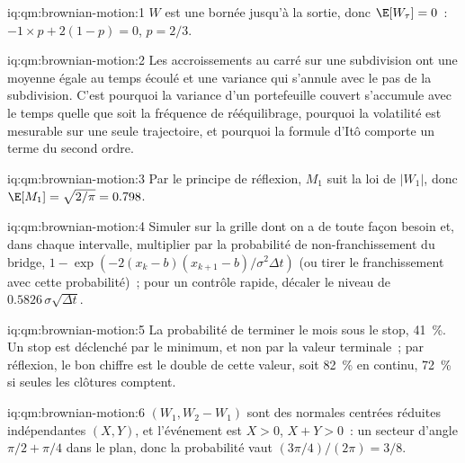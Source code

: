 \begin{solution}{iq:qm:brownian-motion:1}
$W$ est une  bornée jusqu'à la sortie, donc $\E[W_\tau] = 0$~: $-1 \times p + 2(1 - p) = 0$,
$p = 2/3$.
\end{solution}

\begin{solution}{iq:qm:brownian-motion:2}
Les accroissements au carré sur une subdivision ont une moyenne égale au temps écoulé et une variance
qui s'annule avec le pas de la subdivision. C'est pourquoi la variance d'un portefeuille couvert s'accumule avec le temps
quelle que soit la fréquence de rééquilibrage, pourquoi la volatilité est mesurable sur une seule trajectoire, et pourquoi
la formule d'Itô comporte un terme du second ordre.
\end{solution}

\begin{solution}{iq:qm:brownian-motion:3}
Par le principe de réflexion, $M_1$ suit la loi de $|W_1|$, donc $\E[M_1] = \sqrt{2/\pi} = 0.798$.
\end{solution}

\begin{solution}{iq:qm:brownian-motion:4}
Simuler sur la grille dont on a de toute façon besoin et, dans chaque intervalle, multiplier par la probabilité
de non-franchissement du bridge, $1 - \exp(-2(x_k - b)(x_{k+1} - b)/\sigma^2\Delta t)$ (ou tirer le
franchissement avec cette probabilité)~; pour un contrôle rapide, décaler le niveau de $0.5826\,\sigma\sqrt{\Delta t}$.
\end{solution}

\begin{solution}{iq:qm:brownian-motion:5}
La probabilité de terminer le mois sous le stop, 41~\%. Un stop est déclenché par le minimum,
et non par la valeur terminale~; par réflexion, le bon chiffre est le double de cette valeur, soit 82~\% en continu, 72~\%
si seules les clôtures comptent.
\end{solution}

\begin{solution}{iq:qm:brownian-motion:6}
$(W_1, W_2 - W_1)$ sont des normales centrées réduites indépendantes $(X, Y)$, et l'événement est $X > 0$, $X + Y >
0$~: un secteur d'angle $\pi/2 + \pi/4$ dans le plan, donc la probabilité vaut $(3\pi/4)/(2\pi) = 3/8$.
\end{solution}
